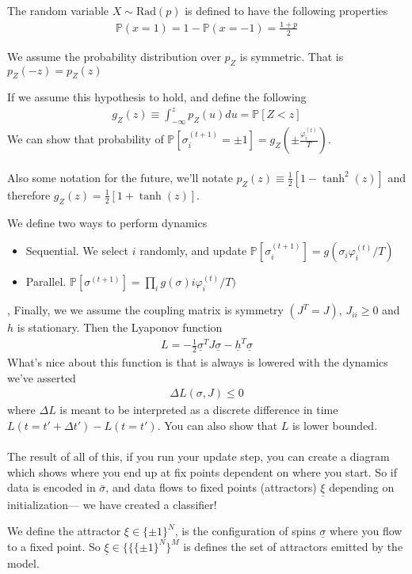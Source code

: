 \begin{definition}
	The random variable $X \sim \text{Rad}(p)$ is defined to have the following properties
	\begin{align}
		\mathbb P(x=1) = 1 - \mathbb P(x = -1) = \frac{1+p}{2}
	\end{align}
\end{definition}
\begin{hypothesis}
	We assume the probability distribution over $p_Z$ is symmetric. That is $p_Z(-z) = p_Z(z)$
\end{hypothesis}
If we assume this hypothesis to hold, and define the following
\begin{align}
	g_Z(z) \equiv \int_{-\infty}^z p_Z(u) du = \mathbb P[Z < z]
\end{align}
We can show that probability of $\mathbb P [\sigma_i^{(t+1)} = \pm 1] = g_Z(\pm \frac{\varphi_i ^{(t)}}{T})$.
\\
\\
Also some notation for the future, we'll notate $p_Z(z) \equiv \frac{1}{2}[1 -\tanh^2(z)]$ and therefore $g_Z(z) =  \frac{1}{2}[1 + \tanh(z)]$.

\begin{definition}
	We define two ways to perform dynamics
	\begin{itemize}
		\item Sequential. We select $i$ randomly, and update $\mathbb P[\sigma_i^{(t+1)}] = g(\sigma_i \varphi_i^{(t)} / T) $
		\item Parallel. $\mathbb P[\sigma^{(t+1)}] = \prod_i g(\sigma)i \varphi_i^{(t)} / T)$
	\end{itemize}
\end{definition},
Finally, we we assume the coupling matrix is symmetry $(J^T = J)$, $J_{ii} \geq 0$ and $h$ is stationary. Then the Lyaponov function
\begin{align}
	L = - \frac{1}{2} \underline \sigma^T J \underline \sigma - \underline h^T \underline\sigma
\end{align}
What's nice about this function is that is always is lowered with the dynamics we've asserted
\begin{align}
	\Delta L (\sigma, J) \leq 0
\end{align}
where $\Delta L$ is meant to be interpreted as a discrete difference in time $L(t=t'+\Delta t') - L(t=t')$. You can also show that $L$ is lower bounded.\\
\\
The result of all of this, if you run your update step, you can create a diagram which shows where you end up at fix points dependent on where you start. So if data is encoded in $\bar \sigma$, and data flows to fixed points (attractors) $\underline \xi$ depending on initialization--- we have created a classifier!
\begin{definition}
	[Attractor] We define the attractor $\xi \in \{\pm 1\}^N$, is the configuration of spins $\underline \sigma$ where you flow to a fixed point. So $\underline \xi \in \{\{ \{\pm 1\}^N\}^M$ is defines the set of attractors emitted by the model.
\end{definition}


